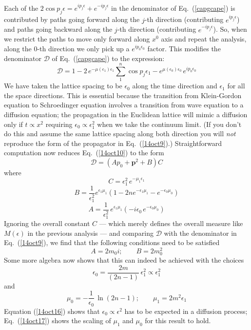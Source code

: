\documentclass{article}
\def\eq#1{{Eq.~(\ref{#1})}}
\begin{document}
Each of the $2\cos p_j \epsilon = e^{ip_j \epsilon} + e^{-ip_j\epsilon}$ in the denominator of \eq{capgcape} is contributed by paths going forward along the $j$-th direction (contributing $
e^{ip_j \epsilon}$) and paths going backward along the $j$-th direction (contributing $ e^{-ip_j\epsilon}$). 
So, when we restrict the paths to move only forward along $x^0$ axis and repeat the analysis,  along the $0$-th direction we only pick up a $e^{ip_0\epsilon_0}$ factor.
This modifies the denominator $\mathcal{D}$ of \eq{capgcape} to the expression:
\begin{equation}
 \mathcal{D} = 1 - 2\, e^{-\mu(\epsilon_1)\epsilon_1} \sum_1^n \cos p_j \epsilon_1 - e^{\mu(\epsilon_0)\epsilon_0} \, e^{i p_0 \epsilon_0}
 \label{14oct10} 
\end{equation} 
 We have taken the lattice spacing to be $\epsilon_0$ along the time direction and $\epsilon_1$ for all the space directions. This is  essential because the transition from Klein-Gordon equation to Schroedinger equation involves a transition from wave equation to a diffusion equation; the propagation in the Euclidean lattice will mimic a diffusion only if $t\propto x^2$ requiring $\epsilon_0\propto \epsilon_1^2$ when we take the continuum limit. (If you don't do this and assume the same lattice spacing along both direction you will \textit{not} reproduce the form of the propagator in \eq{14oct9}.) Straightforward computation now reduces \eq{14oct10}  to the form 
\begin{equation}
 \mathcal{D} = (A p_0 + \bm{p}^2 +B) C
\end{equation} 
 where 
 \begin{equation}
  C=\epsilon_1^2 \, e^{-\mu_1 \epsilon_1}
 \end{equation} 
 \begin{equation}
  B = \frac{1}{\epsilon_1^2} e^{\epsilon_1\mu_1} \left(1- 2 n e^{-\epsilon_1\mu_1} - e^{-\epsilon_0\mu_0}\right)
 \end{equation} 
 \begin{equation}
 A = \frac{1}{\epsilon_1^2} \, e^{\epsilon_1\mu_1} \left( -i\epsilon_0 \, e^{-\epsilon_0\mu_0}\right)
 \end{equation} 
 Ignoring the overall constant $C$ --- which merely defines the overall measure like $M(\epsilon)$ in the previous analysis --- and comparing $\mathcal{D}$ with the denominator in \eq{14oct9}, we find that  the following conditions need to be satisfied
 \begin{equation}
 A = 2 m_0 i; \qquad B=  2 m_0^2
 \end{equation} 
 Some more algebra now shows that this can indeed be achieved with the choices 
 \begin{equation}
 \epsilon_0 = \frac{2m}{(2n-1)}\, \epsilon_1^2 \propto \epsilon_1^2
  \label{14oct16}
 \end{equation} 
 and 
 \begin{equation}
  \mu_0 = - \frac{1}{\epsilon_0} \, \ln(2n-1); \qquad \mu_1 = 2m^2 \epsilon_1
  \label{14oct17}
 \end{equation} 
 Equation (\ref{14oct16}) shows that $\epsilon_0\propto \epsilon^2$ has to be expected in a diffusion process; \eq{14oct17} shows the scaling of $\mu_1$ and $\mu_0$ for this result to hold. 
 
\end{document}

